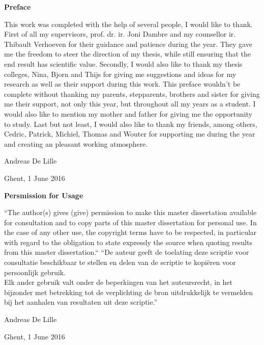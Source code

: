 \newpage

\noindent \textbf{\huge Preface}

\vspace{1.5cm}

\noindent

This work was completed with the help of several people, I would like to thank. First of all my supervisors, prof. dr. ir. Joni Dambre and my counsellor ir. Thibault Verhoeven for their guidance and patience during the year. They gave me the freedom to steer the direction of my thesis, while still ensuring that the end result has scientific value. Secondly, I would also like to thank my thesis colleges, Nina, Bjorn and Thijs for giving me suggestions and ideas for my research as well as their support during this work.
\npar
This preface wouldn't be complete without thanking my parents, stepparents, brothers and sister for giving me their support, not only this year, but throughout all my years as a student. I would also like to mention my mother and father for giving me the opportunity to study.
\npar
Last but not least, I would also like to thank my friends, among others, Cedric, Patrick, Michiel, Thomas and Wouter for supporting me during the year and creating an pleasant working atmosphere. 

\addvspace{3cm}

\hfill \noindent Andreas De Lille

\hfill \noindent Ghent, 1 June 2016


\addvspace{9cm}

\doclicenseThis

\clearpage

\noindent \textbf{\huge Persmission for Usage}
\vspace{1.5cm}

\noindent
``The author(s) gives (give) permission to make this master dissertation available for consultation
and to copy parts of this master dissertation for personal use.
 In the case of any other use, the copyright terms have to be respected, in particular with regard to
the obligation to state expressly the source when quoting results from this master dissertation.``
\npar
``De auteur geeft de toelating deze scriptie voor consultatie beschikbaar
te stellen en delen van de scriptie te kopi\"eren voor persoonlijk
gebruik.\\
Elk ander gebruik valt onder de beperkingen van het auteursrecht,
in het bijzonder met betrekking tot de verplichting de bron uitdrukkelijk
te vermelden bij het aanhalen van resultaten uit deze scriptie.''

\addvspace{4cm}

\hfill \noindent Andreas De Lille

\hfill \noindent Ghent, 1 June 2016